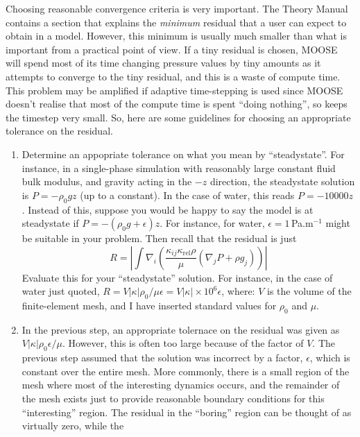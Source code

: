 \documentclass[]{scrreprt}
\begin{document}
Choosing reasonable convergence criteria is very important.  The
Theory Manual contains a section that explains the {\em minimum}
residual that a user can expect to obtain in a model.  However, this
minimum is usually much smaller than what is important from a
practical point of view.  If a tiny residual is chosen, MOOSE will
spend most of its time changing pressure values by tiny amounts as it
attempts to converge to the tiny residual, and this is a waste of
compute time.   This problem may be amplified if adaptive time-stepping is
used since MOOSE doesn't realise that most of the compute time is
spent ``doing nothing'', so keeps the timestep very small.  So, here
are some guidelines for choosing an appropriate tolerance on the
residual.
\begin{enumerate}
\item Determine an appopriate tolerance on what you mean by
  ``steadystate''.  For instance, in a single-phase simulation with
  reasonably large constant fluid bulk modulus, and gravity acting in
  the $-z$ direction, the steadystate solution is $P = -\rho_{0}gz$
  (up to a constant).  In the case of water, this reads $P=-10000z$.
  Instead of this, suppose you would be happy to say the model is at
  steadystate if $P = -(\rho_{0} g + \epsilon)z$.  For instance, for water,
  $\epsilon=1$\,Pa.m$^{-1}$ might be suitable in your problem.  Then recall
  that the residual is just
\begin{equation}
R = \left|\int
\nabla_{i}\left(\frac{\kappa_{ij}\kappa_{\mathrm{rel}}\rho}{\mu}(\nabla_{j}P
+ \rho g_{j}) \right) \right|
\label{eqn.res.int}
\end{equation}
Evaluate this for your ``steadystate'' solution.  For instance, in the
case of water just quoted, $R = V|\kappa|\rho_{0}/\mu\epsilon =
V|\kappa|\times 10^{6}\epsilon$, where: $V$ is the volume of the
finite-element mesh, and I have inserted standard values for
$\rho_{0}$ and $\mu$.  
\item In the previous step, an appropriate tolernace on the residual
  was given as $V|\kappa|\rho_{0}\epsilon/\mu$.  However, this is often too
  large because of the factor of $V$.  The previous step assumed that
  the solution was incorrect by a factor, $\epsilon$, which is constant
  over the entire mesh.   More commonly, there is a small region of
  the mesh where most of the interesting dynamics occurs, and the
  remainder of the mesh exists just to provide reasonable boundary
  conditions for this ``interesting'' region.  The residual in the
  ``boring'' region can be thought of as virtually zero, while the

\end{enumerate}
\end{document}
